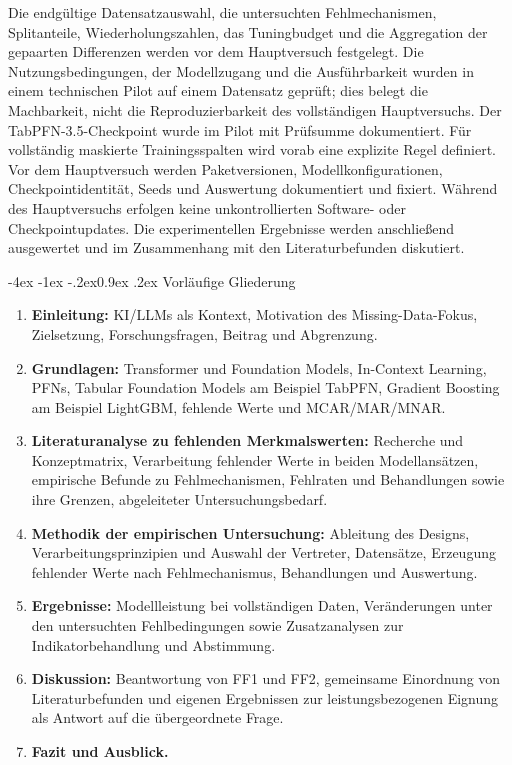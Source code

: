 \documentclass[12pt,a4paper]{article}
\makeatletter
\renewcommand\section{\@startsection{section}{1}{\z@}%
  {-4ex \@plus -1ex \@minus -.2ex}{0.9ex \@plus .2ex}%
  {\normalfont\Large\bfseries}}
\makeatother
\begin{document}
Die endgültige Datensatzauswahl, die untersuchten Fehlmechanismen,
Splitanteile, Wiederholungszahlen, das Tuningbudget und die
Aggregation der gepaarten Differenzen werden vor dem Hauptversuch
festgelegt. Die Nutzungsbedingungen, der
Modellzugang und die Ausführbarkeit wurden in einem technischen Pilot
auf einem Datensatz geprüft; dies belegt die Machbarkeit, nicht die
Reproduzierbarkeit des vollständigen Hauptversuchs. Der
TabPFN-3.5-Checkpoint wurde im Pilot mit Prüfsumme dokumentiert.
Für vollständig maskierte Trainingsspalten wird vorab eine explizite
Regel definiert. Vor dem Hauptversuch werden Paketversionen,
Modellkonfigurationen, Checkpointidentität, Seeds und Auswertung
dokumentiert und fixiert. Während des Hauptversuchs
erfolgen keine unkontrollierten Software- oder Checkpointupdates.
Die experimentellen Ergebnisse werden anschließend ausgewertet und im
Zusammenhang mit den Literaturbefunden diskutiert.

\section{Vorläufige Gliederung}

\begin{enumerate}
  \item \textbf{Einleitung:} KI/LLMs als Kontext, Motivation des
        Missing-Data-Fokus, Zielsetzung, Forschungsfragen, Beitrag und
        Abgrenzung.
  \item \textbf{Grundlagen:} 
        Transformer und Foundation Models, In-Context Learning, PFNs,
        Tabular Foundation Models am Beispiel TabPFN, Gradient Boosting
        am Beispiel LightGBM, fehlende Werte und MCAR/MAR/MNAR.
  \item \textbf{Literaturanalyse zu fehlenden Merkmalswerten:}
        Recherche und Konzeptmatrix, Verarbeitung fehlender Werte in
        beiden Modellansätzen, empirische Befunde zu Fehlmechanismen,
        Fehlraten und Behandlungen sowie ihre Grenzen, abgeleiteter
        Untersuchungsbedarf.
  \item \textbf{Methodik der empirischen Untersuchung:}
        Ableitung des Designs, Verarbeitungsprinzipien und Auswahl der
        Vertreter, Datensätze, Erzeugung fehlender Werte nach
        Fehlmechanismus, Behandlungen und Auswertung.
  \item \textbf{Ergebnisse:} Modellleistung bei vollständigen Daten, Veränderungen unter den untersuchten Fehlbedingungen sowie Zusatzanalysen zur Indikatorbehandlung und Abstimmung.
  \item \textbf{Diskussion:} Beantwortung von FF1 und FF2, gemeinsame
        Einordnung von Literaturbefunden und eigenen Ergebnissen zur
        leistungsbezogenen Eignung als Antwort auf die übergeordnete
        Frage.
  \item \textbf{Fazit und Ausblick.}
\end{enumerate}


{\small

}
\end{document}
